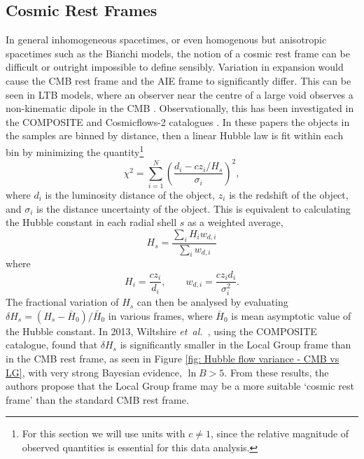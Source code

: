 \documentclass[a4paper,12pt]{report}
\newcommand{\etal}{\emph{et~al.\ }}
\begin{document}
\subsection{Cosmic Rest Frames}
In general inhomogeneous spacetimes, or even homogenous but anisotropic spacetimes such as the Bianchi models, the notion of a cosmic rest frame can be difficult or outright impossible to define sensibly. Variation in expansion would cause the CMB rest frame and the AIE frame to significantly differ. This can be seen in LTB models, where an observer near the centre of a large void observes a non-kinematic dipole in the CMB \cite{RN6}. Observationally, this has been investigated in the COMPOSITE and Cosmicflows-2 catalogues \cite{RN35,RN40,RN122}. In these papers the objects in the samples are binned by distance, then a linear Hubble law is fit within each bin by minimizing the quantity\footnote{For this section we will use units with $c \neq 1$, since the relative magnitude of observed quantities is essential for this data analysis.}
\begin{equation}\label{eqn: chi2 linear hubble law}
  \chi^2 = \sum_{i=1}^{N} \left(\frac{d_i - cz_i/H_s}{\sigma_i}\right)^2,
\end{equation}
where $d_i$ is the luminosity distance of the object, $z_i$ is the redshift of the object, and $\sigma_i$ is the distance uncertainty of the object. This is equivalent to calculating the Hubble constant in each radial shell $s$ as a weighted average,
\begin{equation}\label{eqn: min chi2 H_0}
  H_s = \frac{\sum_{i} H_i w_{d,i}}{\sum_i w_{d,i}}
\end{equation}
where
\begin{equation}
  H_i = \frac{cz_i}{d_i}, \hspace{2em} w_{d,i} = \frac{cz_i d_i}{\sigma_i^2}.
\end{equation}
The fractional variation of $H_s$ can then be analysed by evaluating $\delta H_s = (H_s - \bar{H}_0)/\bar{H}_0$ in various frames, where $\bar{H}_0$ is mean asymptotic value of the Hubble constant. In 2013, Wiltshire \etal \cite{RN35}, using the COMPOSITE catalogue, found that $\delta H_s$ is significantly smaller in the Local Group frame than in the CMB rest frame, as seen in Figure \ref{fig: Hubble flow variance - CMB vs LG}, with very strong Bayesian evidence, $\ln B > 5$.
From these results, the authors propose that the Local Group frame may be a more suitable `cosmic rest frame' than the standard CMB rest frame.
\end{document}
